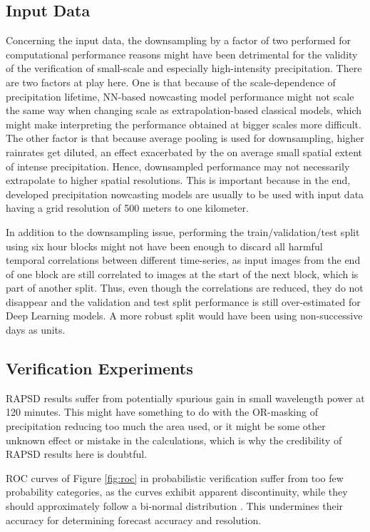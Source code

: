 \subsection{Input Data}

Concerning the input data, the downsampling by a factor of two performed for computational performance reasons might have been detrimental for the validity of the verification of small-scale and especially high-intensity precipitation. There are two factors at play here. One is that because of the scale-dependence of precipitation lifetime, NN-based nowcasting model performance might not scale the same way when changing scale as extrapolation-based classical models, which might make interpreting the performance obtained at bigger scales more difficult. The other factor is that because average pooling is used for downsampling, higher rainrates get diluted, an effect exacerbated by the on average small spatial extent of intense precipitation. Hence, downsampled performance may not necessarily extrapolate to higher spatial resolutions. This is important because in the end, developed precipitation nowcasting models are usually to be used with input data having a grid resolution of 500 meters to one kilometer. 

In addition to the downsampling issue, performing the train/validation/test split using six hour blocks might not have been enough to discard all harmful temporal correlations between different time-series, as input images from the end of one block are still correlated to images at the start of the next block, which is part of another split. Thus, even though the correlations are reduced, they do not disappear and the validation and test split performance is still over-estimated for Deep Learning models. A more robust split would have been using non-successive days as units.

\subsection{Verification Experiments}

RAPSD results suffer from potentially spurious gain in small wavelength power at 120 minutes. This might have something to do with the OR-masking of precipitation reducing too much the area used, or it might be some other unknown effect or mistake in the calculations, which is why the credibility of RAPSD results here is doubtful. 

ROC curves of Figure \ref{fig:roc} in probabilistic verification suffer from too few probability categories, as the curves exhibit apparent discontinuity, while they should approximately follow a bi-normal distribution \cite{mason1982model}. This undermines their accuracy for determining forecast accuracy and resolution.

